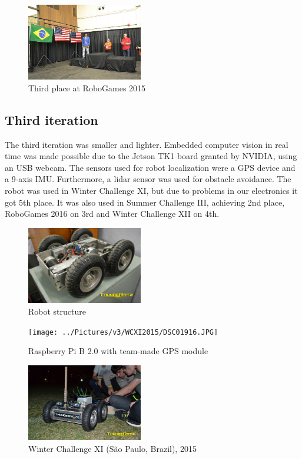 \documentclass[conference]{IEEEtran}
\begin{document}
\begin{figure}[H]
    \centering
    \includegraphics[width=0.45\textwidth]{../Pictures/v2/RG2015/17168959772_304585a0eb_z.jpg}
    \caption{Third place at RoboGames 2015}
\end{figure}

\subsection{Third iteration}
The third iteration was smaller and lighter. Embedded computer vision in real time was made
possible due to the Jetson TK1 board granted by NVIDIA, using an USB webcam. The sensors used
for robot localization were a GPS device and a 9-axis IMU. Furthermore, a lidar sensor was
used for obstacle avoidance.
The robot was used in Winter Challenge XI, but due to problems in our electronics
it got 5th place. It was also used in Summer Challenge III, achieving 2nd place, RoboGames
2016 on 3rd and Winter Challenge XII on 4th.

\begin{figure}[H]
    \centering
    \includegraphics[width=0.45\textwidth]{../Pictures/v3/WCXI2015/1404454_850450764990318_6911866873946202760_o.jpg}
    \caption{Robot structure}
\end{figure}

\begin{figure}[H]
    \centering
    \texttt{[image: ../Pictures/v3/WCXI2015/DSC01916.JPG]}
    \caption{Raspberry Pi B 2.0 with team-made GPS module}
\end{figure}

\begin{figure}[H]
    \centering
    \includegraphics[width=0.45\textwidth]{../Pictures/v3/WCXI2015/11402892_850967411605320_3887305866160117339_o.jpg}
    \caption{Winter Challenge XI (São Paulo, Brazil), 2015}
\end{figure}
\end{document}
